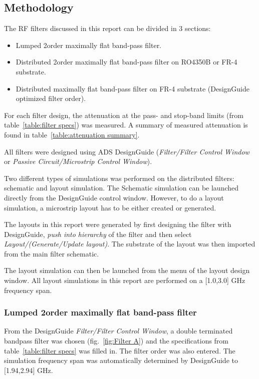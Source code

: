 \documentclass[report.tex]{subfiles}
\begin{document}
\subsection{Methodology}
The RF filters discussed in this report can be divided in 3 sections:
\begin{itemize}
    \item Lumped 2\nd order maximally flat band-pass filter.
    \item Distributed 2\nd order maximally flat band-pass filter on RO4350B or FR-4 substrate.
    \item Distributed maximally flat band-pass filter on FR-4 substrate (DesignGuide optimized filter order).
\end{itemize}
For each filter design, the attenuation at the pass- and stop-band limits (from table~\ref{table:filter specs}) was measured. A summary of measured attenuation is found in table~\ref{table:attenuation summary}.

All filters were designed using ADS DesignGuide (\emph{Filter/Filter Control Window} or \emph{Passive Circuit/Microstrip Control Window}).

Two different types of simulations was performed on the distributed filters: schematic and layout simulation. The Schematic simulation can be launched directly from the DesignGuide control window. However, to do a layout simulation, a microstrip layout has to be either created or generated.

The layouts in this report were generated by first designing the filter with DesignGuide, \emph{push into hierarchy} of the filter and then select \emph{Layout/(Generate/Update layout)}. The substrate of the layout was then imported from the main filter schematic.

The layout simulation can then be launched from the menu of the layout design window. All layout simulations in this report are performed on a [1.0,3.0] GHz frequency span.

\subsubsection{Lumped 2\nd order maximally flat band-pass filter}
From the DesignGuide \emph{Filter/Filter Control Window}, a double terminated bandpass filter was chosen (fig.~\ref{fig:Filter A}) and the specifications from table~\ref{table:filter specs} was filled in. The filter order was also entered. The simulation frequency span was automatically determined by DesignGuide to [1.94,2.94] GHz.
\end{document}
